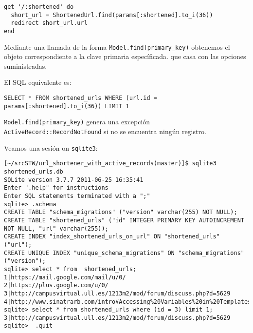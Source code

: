 \begin{verbatim}
get '/:shortened' do
  short_url = ShortenedUrl.find(params[:shortened].to_i(36))
  redirect short_url.url
end
\end{verbatim}
Mediante una llamada de la forma \verb|Model.find(primary_key)|
obtenemos el objeto correspondiente a la clave primaria específicada.
que casa con las opciones suministradas.

El SQL equivalente es:

\begin{verbatim}
SELECT * FROM shortened_urls WHERE (url.id = params[:shortened].to_i(36)) LIMIT 1
\end{verbatim}
\verb|Model.find(primary_key)|
genera una excepción  \verb|ActiveRecord::RecordNotFound|
si no se encuentra ningún registro.

Veamos una sesión on \verb|sqlite3|:
\begin{verbatim}
[~/srcSTW/url_shortener_with_active_records(master)]$ sqlite3 shortened_urls.db 
SQLite version 3.7.7 2011-06-25 16:35:41
Enter ".help" for instructions
Enter SQL statements terminated with a ";"
sqlite> .schema
CREATE TABLE "schema_migrations" ("version" varchar(255) NOT NULL);
CREATE TABLE "shortened_urls" ("id" INTEGER PRIMARY KEY AUTOINCREMENT NOT NULL, "url" varchar(255));
CREATE INDEX "index_shortened_urls_on_url" ON "shortened_urls" ("url");
CREATE UNIQUE INDEX "unique_schema_migrations" ON "schema_migrations" ("version");
sqlite> select * from  shortened_urls;
1|https://mail.google.com/mail/u/0/
2|https://plus.google.com/u/0/
3|http://campusvirtual.ull.es/1213m2/mod/forum/discuss.php?d=5629
4|http://www.sinatrarb.com/intro#Accessing%20Variables%20in%20Templates
sqlite> select * from shortened_urls where (id = 3) limit 1;
3|http://campusvirtual.ull.es/1213m2/mod/forum/discuss.php?d=5629
sqlite>  .quit
\end{verbatim}

